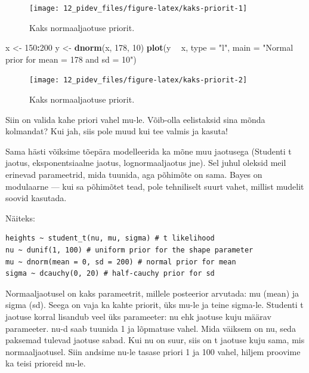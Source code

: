 \documentclass[]{book}
\newenvironment{Shaded}{\begin{snugshade}}{\end{snugshade}}
\newcommand{\KeywordTok}[1]{\textcolor[rgb]{0.13,0.29,0.53}{\textbf{#1}}}
\newcommand{\DataTypeTok}[1]{\textcolor[rgb]{0.13,0.29,0.53}{#1}}
\newcommand{\DecValTok}[1]{\textcolor[rgb]{0.00,0.00,0.81}{#1}}
\newcommand{\StringTok}[1]{\textcolor[rgb]{0.31,0.60,0.02}{#1}}
\newcommand{\OperatorTok}[1]{\textcolor[rgb]{0.81,0.36,0.00}{\textbf{#1}}}
\newcommand{\NormalTok}[1]{#1}
\begin{document}
\begin{figure}
\texttt{[image: 12\_pidev\_files/figure-latex/kaks-priorit-1]} \caption{Kaks normaaljaotuse priorit.}\label{fig:kaks-priorit1}
\end{figure}

\begin{Shaded}
\begin{Highlighting}[]
\NormalTok{x <-}\StringTok{ }\DecValTok{150}\OperatorTok{:}\DecValTok{200}
\NormalTok{y <-}\StringTok{ }\KeywordTok{dnorm}\NormalTok{(x, }\DecValTok{178}\NormalTok{, }\DecValTok{10}\NormalTok{)}
\KeywordTok{plot}\NormalTok{(y }\OperatorTok{~}\StringTok{ }\NormalTok{x, }\DataTypeTok{type =} \StringTok{"l"}\NormalTok{, }\DataTypeTok{main =} \StringTok{"Normal prior for mean = 178 and sd = 10"}\NormalTok{)}
\end{Highlighting}
\end{Shaded}

\begin{figure}
\texttt{[image: 12\_pidev\_files/figure-latex/kaks-priorit-2]} \caption{Kaks normaaljaotuse priorit.}\label{fig:kaks-priorit2}
\end{figure}

Siin on valida kahe priori vahel mu-le. Võib-olla eelistaksid sina mõnda
kolmandat? Kui jah, siis pole muud kui tee valmis ja kasuta!

Sama hästi võiksime tõepära modelleerida ka mõne muu jaotusega (Studenti
t jaotus, eksponentsiaalne jaotus, lognormaaljaotus jne). Sel juhul
oleksid meil erinevad parameetrid, mida tuunida, aga põhimõte on sama.
Bayes on modulaarne --- kui sa põhimõtet tead, pole tehniliselt suurt
vahet, millist mudelit soovid kasutada.

Näiteks:

\begin{verbatim}
heights ~ student_t(nu, mu, sigma) # t likelihood
nu ~ dunif(1, 100) # uniform prior for the shape parameter
mu ~ dnorm(mean = 0, sd = 200) # normal prior for mean
sigma ~ dcauchy(0, 20) # half-cauchy prior for sd
\end{verbatim}

Normaaljaotusel on kaks parameetrit, millele posteerior arvutada: mu
(mean) ja sigma (sd). Seega on vaja ka kahte priorit, üks mu-le ja teine
sigma-le. Studenti t jaotuse korral lisandub veel üks parameeter: nu ehk
jaotuse kuju määrav parameeter. nu-d saab tuunida 1 ja lõpmatuse vahel.
Mida väiksem on nu, seda paksemad tulevad jaotuse sabad. Kui nu on suur,
siis on t jaotuse kuju sama, mis normaaljaotusel. Siin andsime nu-le
tasase priori 1 ja 100 vahel, hiljem proovime ka teisi prioreid nu-le.
\end{document}
